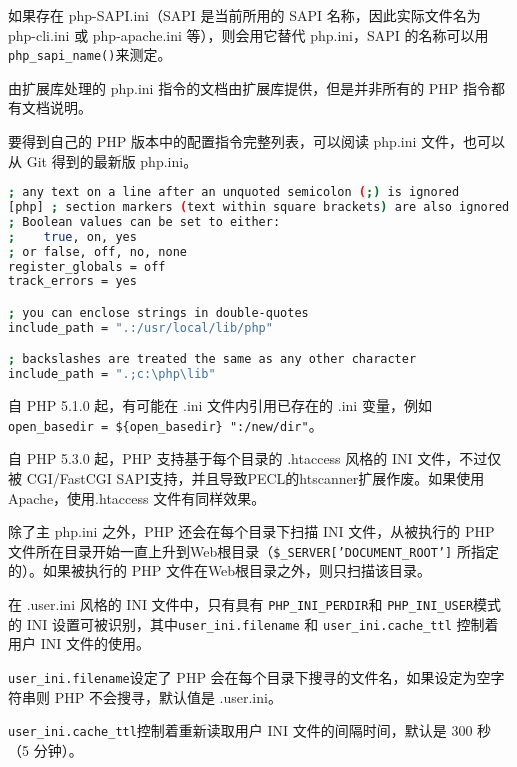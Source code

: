 如果存在 php-SAPI.ini（SAPI 是当前所用的 SAPI 名称，因此实际文件名为 php-cli.ini 或 php-apache.ini 等），则会用它替代 php.ini，SAPI 的名称可以用 \texttt{php\_sapi\_name()}来测定。


由扩展库处理的 php.ini 指令的文档由扩展库提供，但是并非所有的 PHP 指令都有文档说明。

要得到自己的 PHP 版本中的配置指令完整列表，可以阅读 php.ini 文件，也可以从 Git 得到的最新版 php.ini。



\begin{lstlisting}[language=bash]
; any text on a line after an unquoted semicolon (;) is ignored
[php] ; section markers (text within square brackets) are also ignored
; Boolean values can be set to either:
;    true, on, yes
; or false, off, no, none
register_globals = off
track_errors = yes

; you can enclose strings in double-quotes
include_path = ".:/usr/local/lib/php"

; backslashes are treated the same as any other character
include_path = ".;c:\php\lib"
\end{lstlisting}

自 PHP 5.1.0 起，有可能在 .ini 文件内引用已存在的 .ini 变量，例如\texttt{open\_basedir = \$\{open\_basedir\} ":/new/dir"}。


自 PHP 5.3.0 起，PHP 支持基于每个目录的 .htaccess 风格的 INI 文件，不过仅被 CGI/FastCGI SAPI支持，并且导致PECL的htscanner扩展作废。如果使用 Apache，使用.htaccess 文件有同样效果。

除了主 php.ini 之外，PHP 还会在每个目录下扫描 INI 文件，从被执行的 PHP 文件所在目录开始一直上升到Web根目录（\texttt{\$\_SERVER['DOCUMENT\_ROOT']} 所指定的）。如果被执行的 PHP 文件在Web根目录之外，则只扫描该目录。

在 .user.ini 风格的 INI 文件中，只有具有 \texttt{PHP\_INI\_PERDIR}和 \texttt{PHP\_INI\_USER}模式的 INI 设置可被识别，其中\texttt{user\_ini.filename} 和 \texttt{user\_ini.cache\_ttl} 控制着用户 INI 文件的使用。

\begin{compactitem}
\item \texttt{user\_ini.filename}设定了 PHP 会在每个目录下搜寻的文件名，如果设定为空字符串则 PHP 不会搜寻，默认值是 .user.ini。

\item \texttt{user\_ini.cache\_ttl}控制着重新读取用户 INI 文件的间隔时间，默认是 300 秒（5 分钟）。

\end{compactitem}

